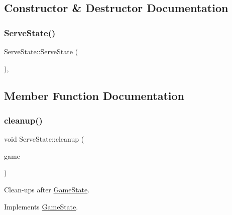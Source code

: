 \subsection{Constructor \& Destructor Documentation}
\mbox{\label{class_serve_state_a4c147afd3a49deed30013aaad7052383}} 
\subsubsection{\texorpdfstring{ServeState()}{ServeState()}}
{\footnotesize\ttfamily Serve\+State\+::\+Serve\+State (\begin{DoxyParamCaption}{ }\end{DoxyParamCaption})\hspace{0.3cm}{\ttfamily [inline]}, {\ttfamily [protected]}}



\subsection{Member Function Documentation}
\mbox{\label{class_serve_state_a3516119feb2bf386b3686867da412328}} 
\subsubsection{\texorpdfstring{cleanup()}{cleanup()}}
{\footnotesize\ttfamily void Serve\+State\+::cleanup (\begin{DoxyParamCaption}\item[{\mbox{\hyperlink{class_game_engine}{Game\+Engine}} $\ast$}]{game }\end{DoxyParamCaption})\hspace{0.3cm}{\ttfamily [virtual]}}



Clean-\/ups after \mbox{\hyperlink{class_game_state}{Game\+State}}. 



Implements \mbox{\hyperlink{class_game_state_a7df4ea0b4815d2b3b35dbec2a399a0b6}{Game\+State}}.

\mbox{\label{class_serve_state_a8f372bdf6b72e8d4ae9eaa1b45a4d844}} 
